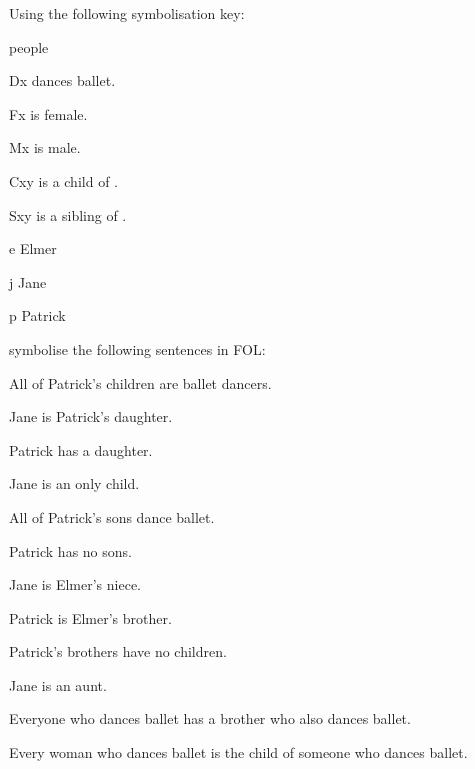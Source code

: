 \solutions
\problempart
\label{pr.FOLballet}
Using the following symbolisation key:
\begin{ekey}
\item[\text{domain}] people
\item[Dx]  dances ballet.
\item[Fx]  is female.
\item[Mx]  is male.
\item[Cxy]  is a child of .
\item[Sxy]  is a sibling of .
\item[e] Elmer
\item[j] Jane
\item[p] Patrick
\end{ekey}
symbolise the following sentences in FOL:
\begin{earg}
\item All of Patrick's children are ballet dancers.
\item[] 
\item Jane is Patrick's daughter.
\item[] 
\item Patrick has a daughter.
\item[] 
\item Jane is an only child.
\item[] 
\item All of Patrick's sons dance ballet.
\item[] 
\item Patrick has no sons.
\item[] 
\item Jane is Elmer's niece.
\item[] 
\item Patrick is Elmer's brother.
\item[] 
\item Patrick's brothers have no children.
\item[] 
\item Jane is an aunt.
\item[] 
\item Everyone who dances ballet has a brother who also dances ballet.
\item[] 
\item Every woman who dances ballet is the child of someone who dances ballet.
\item[] 
\end{earg}


